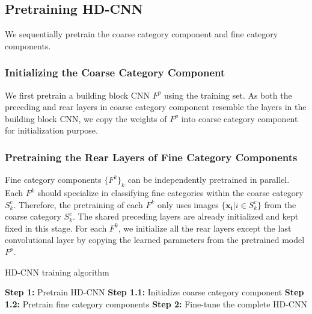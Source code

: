 \documentclass[10pt,twocolumn,letterpaper]{article}
\begin{document}
\subsection{Pretraining HD-CNN}
We sequentially pretrain the coarse category component and fine category components.
\subsubsection{Initializing the Coarse Category Component}
\label{sec:pretrain_coarse}
We first pretrain a building block CNN $F^p$ using the training set. As both the preceding and rear layers in coarse category component resemble the layers in the building block CNN, we copy the weights of $F^p$ into coarse category component for initialization purpose.




\subsubsection{Pretraining the Rear Layers of Fine Category Components}
\label{sec:pretrain_fine}

Fine category components $\{F^{k}\}_k$ can be independently pretrained in parallel. Each $F^k$ should specialize in classifying fine categories within the coarse category $S^{c}_{k}$. Therefore, the pretraining of each $F^{k}$ only uses images $\{\mathbf{x_i} | i\in S^{c}_{k} \} $ from the coarse category $S^{c}_{k}$.
The shared preceding layers are already initialized and kept fixed in this stage. For each $F^{k}$, we initialize all the rear layers except the last convolutional layer by copying the learned parameters from the pretrained model $F^p$.



\begin{algorithm}[!t]
\label{alg:hdcnn_train}
\caption{HD-CNN training algorithm}\label{euclid}
\begin{algorithmic}[1]

\State \textbf{Step 1:} Pretrain HD-CNN
\State \hspace{\algorithmicindent}   \textbf{Step 1.1:} Initialize coarse category component
\State \hspace{\algorithmicindent}   \textbf{Step 1.2:} Pretrain fine category components
\State \textbf{Step 2:} Fine-tune the complete HD-CNN
\EndProcedure
\end{algorithmic}
\label{alg:hdcnn_training}
\end{algorithm}
\end{document}

